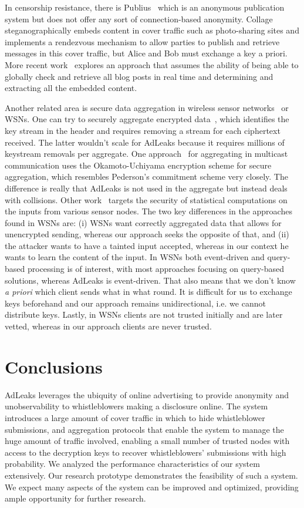 \documentclass[twocolumn,10pt]{article}
\begin{document}
In censorship resistance, there is Publius~\cite{WaldmanRC2000} which is an
anonymous publication system but does not offer any sort of connection-based
anonymity. Collage~\cite{BurnettFV2010} steganographically embeds content in
cover traffic such as photo-sharing sites and implements a rendezvous
mechanism to allow parties to publish and retrieve messages in this cover
traffic, but Alice and Bob must exchange a key a priori. More recent
work~\cite{InvernizziKV2012} explores an approach that assumes the ability
of being able to globally check and retrieve all blog posts in real time and
determining and extracting all the embedded content.

Another related area is secure data aggregation in wireless sensor
networks~\cite{Alzaid2011} or WSNs. One can try to securely aggregate
encrypted data~\cite{Castelluccia2009}, which identifies the key stream in
the header and requires removing a stream for each ciphertext received. The
latter wouldn't scale for AdLeaks because it requires millions of keystream
removals per aggregate. One approach~\cite{ViejoWD2012} for aggregating in
multicast communication uses the Okamoto-Uchiyama encryption scheme for
secure aggregation, which resembles Pederson's commitment scheme very
closely. The difference is really that AdLeaks is not used in the aggregate
but instead deals with collisions. Other work~\cite{Wagner2004,ChanPPS2007}
targets the security of statistical computations on the inputs from various
sensor nodes. The two key differences in the approaches found in WSNs are:
(i) WSNs want correctly aggregated data that allows for unencrypted sending,
whereas our approach seeks the opposite of that, and (ii) the attacker wants
to have a tainted input accepted, whereas in our context he wants to learn
the content of the input. In WSNs both event-driven and query-based
processing is of interest, with most approaches focusing on query-based
solutions, whereas AdLeaks is event-driven. That also means that we don't
know \emph{a priori} which client sends what in what round. It is difficult
for us to exchange keys beforehand and our approach remains unidirectional,
i.e. we cannot distribute keys. Lastly, in WSNs clients are not trusted
initially and are later vetted, whereas in our approach clients are never
trusted.


\section{Conclusions}

AdLeaks leverages the ubiquity of online advertising to provide anonymity
and unobservability to whistleblowers making a disclosure online. The system
introduces a large amount of cover traffic in which to hide whistleblower
submissions, and aggregation protocols that enable the system to manage the
huge amount of traffic involved, enabling a small number of trusted nodes
with access to the decryption keys to recover whistleblowers' submissions
with high probability. We analyzed the performance characteristics of our
system extensively. Our research prototype demonstrates the feasibility of
such a system. We expect many aspects of the system can be improved and
optimized, providing ample opportunity for further research.
\end{document}
